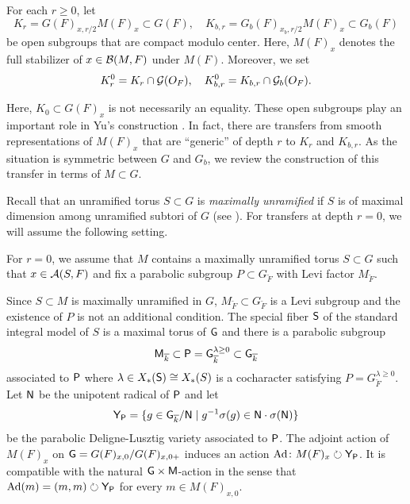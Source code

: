 \documentclass[12pt,reqno]{amsart}
\begin{document}
\begin{defi} \label{defi:level_subgroups}
    For each $r \geq 0$, let 
    \[
        K_r = G(F)_{x, r/2} M(F)_{x} \subset G(F) ,\quad 
        K_{b, r} = G_b(F)_{x_b, r / 2} M(F)_{x} \subset G_b(F)
    \]
    be open subgroups that are compact modulo center. Here, $M(F)_x$ denotes the full stabilizer of $x \in {\mathcal{B}}(M, F)$ under $M(F)$. Moreover, we set 
    \[
        K_r^0 = K_r \cap {\mathcal{G}}(O_F) ,\quad 
        K_{b, r}^0 = K_{b, r} \cap {\mathcal{G}}_b(O_F). 
    \]
\end{defi}

Here, $K_0 \subset G(F)_x$ is not necessarily an equality. These open subgroups play an important role in Yu's construction \cite{Yu01}. In fact, there are transfers from smooth representations of $M(F)_{x}$ that are ``generic'' of depth $r$ to $K_r$ and $K_{b, r}$. As the situation is symmetric between $G$ and $G_b$, we review the construction of this transfer in terms of $M \subset G$. 

Recall that an unramified torus $S \subset G$ is \textit{maximally unramified} if $S$ is of maximal dimension among unramified subtori of $G$ (see \cite[Definition 3.4.2]{Kal19}). For transfers at depth $r = 0$, we will assume the following setting. 

\begin{ass} \label{ass:when_r=0}
    For $r = 0$, we assume that $M$ contains a maximally unramified torus $S \subset G$ such that $x \in {\mathcal{A}}(S, F)$ and fix a parabolic subgroup $P \subset G_{\breve{F}}$ with Levi factor $M_{\breve{F}}$. 
\end{ass}

\begin{sett} \label{sett:parabolic_r=0}
    Since $S \subset M$ is maximally unramified in $G$, $M_{\breve{F}} \subset G_{\breve{F}}$ is a Levi subgroup and the existence of $P$ is not an additional condition. The special fiber ${\mathsf{S}}$ of the standard integral model of $S$ is a maximal torus of ${\mathsf{G}}$ and there is a parabolic subgroup
    \[
        {\mathsf{M}}_{{\overline{k}}} \subset {\mathsf{P}} = {\mathsf{G}}_{{\overline{k}}}^{\lambda \geq 0} \subset {\mathsf{G}}_{{\overline{k}}}
    \]
    associated to ${\mathsf{P}}$ where $\lambda \in X_*({\mathsf{S}}) \cong X_*(S)$ is a cocharacter satisfying $P = G_{\breve{F}}^{\lambda \geq 0}$. Let ${\mathsf{N}}$ be the unipotent radical of ${\mathsf{P}}$ and let 
    \[
        {\mathsf{Y}}_{{\mathsf{P}}} = \{ g \in {\mathsf{G}}_{{\overline{k}}} / {\mathsf{N}} \mid g ^{-1} \sigma(g) \in {\mathsf{N}} \cdot \sigma({\mathsf{N}}) \}
    \]
    be the parabolic Deligne-Lusztig variety associated to ${\mathsf{P}}$. The adjoint action of $M(F)_x$ on ${\mathsf{G}} = G(F)_{x, 0} / G(F)_{x, 0+}$ induces an action ${\operatorname{Ad}}\colon M(F)_x \circlearrowright {\mathsf{Y}}_{{\mathsf{P}}}$. It is compatible with the natural ${\mathsf{G}} \times {\mathsf{M}}$-action in the sense that ${\operatorname{Ad}}(m) = (m, m) \circlearrowright {\mathsf{Y}}_{{\mathsf{P}}}$ for every $m \in M(F)_{x, 0}$. 
\end{sett}
\end{document}

